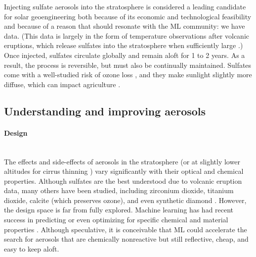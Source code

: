 \documentclass[11pt]{report}
\newcommand{\Gap}{\texorpdfstring{\hfill}{}}
\newcommand{\Longterm}{\texorpdfstring{{\small\emph{\color{OliveGreen}{\fbox{Long-term}}}}}{}}
\begin{document}
Injecting sulfate aerosols into the stratosphere is considered a leading candidate for solar geoengineering both because of its economic and technological feasibility \cite{mcclellan2012cost,smith2018production} and because of a reason that should resonate with the ML community: we have data. (This data is largely in the form of temperature observations after volcanic eruptions, which release sulfates into the stratosphere when sufficiently large \cite{robock2013studying}.) Once injected, sulfates circulate globally and remain aloft for 1 to 2 years. As a result, the process is reversible, but must also be continually maintained. Sulfates come with a well-studied risk of ozone loss \cite{eastham2018quantifying}, and they make sunlight slightly more diffuse, which can impact agriculture \cite{proctor2018estimating}.

\subsection{Understanding and improving aerosols}
\label{subsub:better-aerosols}

\paragraph*{Design}\Gap\mbox{\Longterm}\\
The effects and side-effects of aerosols in the stratosphere (or at slightly lower altitudes for cirrus thinning \cite{doi:10.1029/2018JD029815}) vary significantly with their optical and chemical properties. Although sulfates are the best understood due to volcanic eruption data, many others have been studied, including zirconium dioxide, titanium dioxide, calcite (which preserves ozone), and even synthetic diamond \cite{dykema2016improved}. However, the design space is far from fully explored. Machine learning has had recent success in predicting or even optimizing for specific chemical and material properties \cite{raccuglia2016machine,liu2017materials,gomez2018automatic,butler2018machine}. Although speculative, it is conceivable that ML could accelerate the search for aerosols that are chemically nonreactive but still reflective, cheap, and easy to keep aloft.
\end{document}
